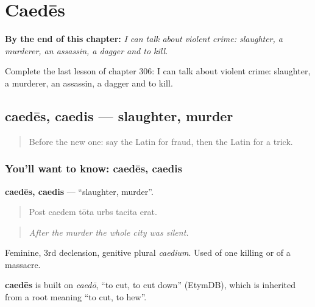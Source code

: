 
\chapter{Caedēs}
\label{ch:la-caedes}

\begin{chapteropening}
\textbf{By the end of this chapter:} \emph{I can talk about violent crime: slaughter, a murderer, an assassin, a dagger and to kill.}

Complete the last lesson of chapter 306: I can talk about violent crime: slaughter, a murderer, an assassin, a dagger and to kill.
\end{chapteropening}

\section[caedēs, caedis]{caedēs, caedis — slaughter, murder}

\label{lesson:LA-C306-caedes}



\begin{quote}
Before the new one: say the Latin for fraud, then the Latin for a trick.
\end{quote}

\subsection*{You'll want to know: caedēs, caedis}
\textbf{caedēs, caedis} — \textquotedblleft{}slaughter, murder\textquotedblright{}.

\begin{quote}
Post caedem tōta urbs tacita erat.
\end{quote}

\begin{quote}
\emph{After the murder the whole city was silent.}
\end{quote}

Feminine, 3rd declension, genitive plural \emph{caedium}. Used of one killing or of a massacre.

\begin{cousinweb}
\textbf{caedēs} is built on \emph{caedō}, \textquotedblleft{}to cut, to cut down\textquotedblright{} (EtymDB), which is inherited from a root meaning \textquotedblleft{}to cut, to hew\textquotedblright{}.
\end{cousinweb}

